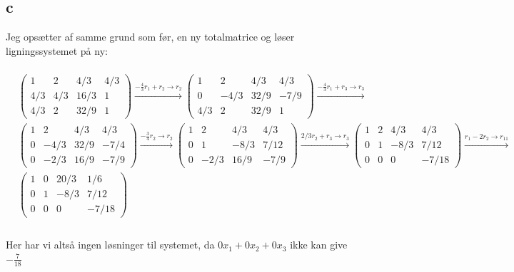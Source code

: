 \documentclass{article}
\begin{document}
\subsection*{c}
Jeg opsætter af samme grund som før, en ny totalmatrice og løser ligningssystemet på ny:
\\
\\
$\begin{aligned} & \left(\begin{array}{ccc|c}1 & 2 & 4 / 3 & 4 / 3 \\ 4 / 3 & 4 / 3 & 16 / 3 & 1 \\ 4 / 3 & 2 & 32 / 9 & 1\end{array}\right) \stackrel{-\frac{4}{3} r_1+r_2 \rightarrow r_2}{\longrightarrow}\left(\begin{array}{ccc|c}1 & 2 & 4 / 3 & 4 / 3 \\ 0 & -4 / 3 & 32 / 9 & -7 / 9 \\ 4 / 3 & 2 & 32 / 9 & 1\end{array}\right) \stackrel{-\frac{4}{3} r_1+r_3 \rightarrow r_3}{\longrightarrow} \\ & \left(\begin{array}{ccc|c}1 & 2 & 4 / 3 & 4 / 3 \\ 0 & -4 / 3 & 32 / 9 & -7 / 4 \\ 0 & -2 / 3 & 16 / 9 & -7 / 9\end{array}\right) \stackrel{-\frac{3}{4} r_2 \rightarrow r_2}{\longrightarrow}\left(\begin{array}{ccc|c}1 & 2 & 4 / 3 & 4 / 3 \\ 0 & 1 & -8 / 3 & 7 / 12 \\ 0 & -2 / 3 & 16 / 9 & -7 / 9\end{array}\right) \stackrel{2 / 3 r_2+r_3 \rightarrow r_3}{\longrightarrow}\left(\begin{array}{ccc|c}1 & 2 & 4 / 3 & 4 / 3 \\ 0 & 1 & -8 / 3 & 7 / 12 \\ 0 & 0 & 0 & -7 / 18\end{array}\right) \stackrel{r_1-2 r_2 \rightarrow r_{11}}{\longrightarrow} \\ & \left(\begin{array}{ccc|c}1 & 0 & 20 / 3 & 1 / 6 \\ 0 & 1 & -8 / 3 & 7 / 12 \\ 0 & 0 & 0 & -7 / 18\end{array}\right) \\ & \end{aligned}$
\\
\\
Her har vi altså ingen løsninger til systemet, da $0x_1+0x_2+0x_3$ ikke kan give $-\frac{7}{18}$
\end{document}
